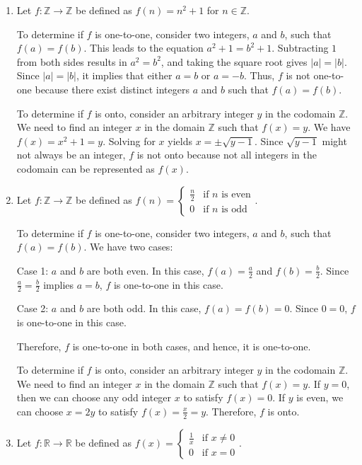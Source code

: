 \documentclass{article}
\newcommand{\Z}{\mathbb{Z}}
\newcommand{\R}{\mathbb{R}}
\theoremstyle{definition}
\begin{document}
\begin{solution}
\begin{enumerate}
    \item Let $f : \Z \to \Z$ be defined as $f(n) = n^2 + 1$ for $n \in \Z$. 

    To determine if $f$ is one-to-one, consider two integers, $a$ and $b$, such that $f(a) = f(b)$. This leads to the equation $a^2 + 1 = b^2 + 1$. Subtracting $1$ from both sides results in $a^2 = b^2$, and taking the square root gives $|a| = |b|$. Since $|a| = |b|$, it implies that either $a = b$ or $a = -b$. Thus, $f$ is not one-to-one because there exist distinct integers $a$ and $b$ such that $f(a) = f(b)$.

    To determine if $f$ is onto, consider an arbitrary integer $y$ in the codomain $\Z$. We need to find an integer $x$ in the domain $\Z$ such that $f(x) = y$. We have $f(x) = x^2 + 1 = y$. Solving for $x$ yields $x = \pm \sqrt{y - 1}$. Since $\sqrt{y - 1}$ might not always be an integer, $f$ is not onto because not all integers in the codomain can be represented as $f(x)$.

    \item Let $f : \Z \to \Z$ be defined as $f(n) = \begin{cases}
            \frac{n}{2} & \text{if } n \text{ is even} \\
            0 & \text{if } n \text{ is odd}
        \end{cases}$.

    To determine if $f$ is one-to-one, consider two integers, $a$ and $b$, such that $f(a) = f(b)$. We have two cases:
    
    Case 1: $a$ and $b$ are both even. In this case, $f(a) = \frac{a}{2}$ and $f(b) = \frac{b}{2}$. Since $\frac{a}{2} = \frac{b}{2}$ implies $a = b$, $f$ is one-to-one in this case.
    
    Case 2: $a$ and $b$ are both odd. In this case, $f(a) = f(b) = 0$. Since $0 = 0$, $f$ is one-to-one in this case.
    
    Therefore, $f$ is one-to-one in both cases, and hence, it is one-to-one.

    To determine if $f$ is onto, consider an arbitrary integer $y$ in the codomain $\Z$. We need to find an integer $x$ in the domain $\Z$ such that $f(x) = y$. If $y = 0$, then we can choose any odd integer $x$ to satisfy $f(x) = 0$. If $y$ is even, we can choose $x = 2y$ to satisfy $f(x) = \frac{x}{2} = y$. Therefore, $f$ is onto.

    \item Let $f : \R \to \R$ be defined as $f(x) = \begin{cases}
            \frac{1}{x} & \text{if } x \neq 0 \\
            0 & \text{if } x = 0
        \end{cases}$.


\end{enumerate}
\end{solution}
\end{document}
